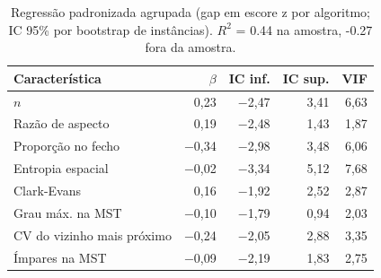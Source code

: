 \begin{table}[htb]
\centering
\caption{Regressão padronizada agrupada (gap em escore z por algoritmo; IC 95\% por bootstrap de instâncias). $R^2$ = 0.44 na amostra, -0.27 fora da amostra.}
\label{tab:sensitivity-regression}
\small
\setlength{\tabcolsep}{4pt}
\begin{tabular}{lrrrr}
\toprule
Característica & $\beta$ & IC inf. & IC sup. & VIF \\
\midrule
$n$ & 0{,}23 & $-$2{,}47 & 3{,}41 & 6{,}63 \\
Razão de aspecto & 0{,}19 & $-$2{,}48 & 1{,}43 & 1{,}87 \\
Proporção no fecho & $-$0{,}34 & $-$2{,}98 & 3{,}48 & 6{,}06 \\
Entropia espacial & $-$0{,}02 & $-$3{,}34 & 5{,}12 & 7{,}68 \\
Clark-Evans & 0{,}16 & $-$1{,}92 & 2{,}52 & 2{,}87 \\
Grau máx. na MST & $-$0{,}10 & $-$1{,}79 & 0{,}94 & 2{,}03 \\
CV do vizinho mais próximo & $-$0{,}24 & $-$2{,}05 & 2{,}88 & 3{,}35 \\
Ímpares na MST & $-$0{,}09 & $-$2{,}19 & 1{,}83 & 2{,}75 \\
\bottomrule
\end{tabular}
\end{table}
